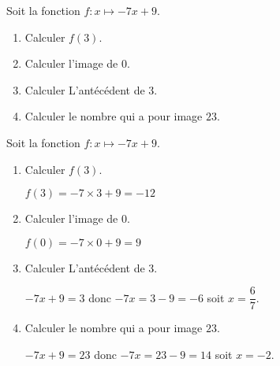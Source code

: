 \begin{exercice}
    Soit la fonction $f:x\longmapsto -7x+9$.
    \begin{enumerate}        
        \item Calculer $f(3)$.
        \item Calculer l'image de $0$.
        \item Calculer L'antécédent de $3$.
        \item Calculer le nombre qui a pour image $23$.
    \end{enumerate}
\end{exercice}
\begin{corrige}
    Soit la fonction $f:x\longmapsto -7x+9$.

    \begin{enumerate}        
        \item Calculer $f(3)$.
        
        {\red $f(3) = -7\times 3 + 9 = -12$}
        \item Calculer l'image de $0$.
        
        {\red $f(0) = -7\times 0 + 9 = 9$}
        \item Calculer L'antécédent de $3$.
        
        {\red $-7x + 9 = 3$ donc $-7x=3-9=-6$ soit $x=\dfrac{6}{7}$.}
        \item Calculer le nombre qui a pour image $23$.
        
        {\red $-7x+9=23$ donc $-7x=23-9=14$ soit $x=-2$.}
    \end{enumerate}
\end{corrige}
